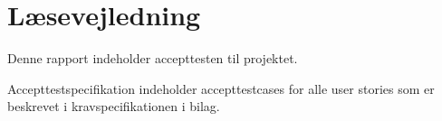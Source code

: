 \chapter*{Læsevejledning}
Denne rapport indeholder accepttesten til projektet. 

Accepttestspecifikation indeholder accepttestcases for alle user stories som er beskrevet i kravspecifikationen i bilag. 

